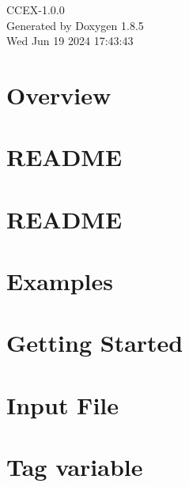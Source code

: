 \documentclass[twoside]{book}
\newcommand{\clearemptydoublepage}{%
  \newpage{\pagestyle{empty}\cleardoublepage}%
}
\begin{document}
\hypersetup{pageanchor=false}
\begin{titlepage}
\vspace*{7cm}
\begin{center}%
{\Large C\-C\-E\-X-\/1.0.0 }\\
\vspace*{1cm}
{\large Generated by Doxygen 1.8.5}\\
\vspace*{0.5cm}
{\small Wed Jun 19 2024 17:43:43}\\
\end{center}
\end{titlepage}
\clearemptydoublepage
\tableofcontents
\clearemptydoublepage
{}
\hypersetup{pageanchor=true}

\chapter{Overview}
\label{index}\hypertarget{index}{}
\chapter{R\-E\-A\-D\-M\-E}
\label{md__home_huijin_git_CCEX_README}
\hypertarget{md__home_huijin_git_CCEX_README}{}

\chapter{R\-E\-A\-D\-M\-E}
\label{README}
\hypertarget{README}{}

\chapter{Examples}
\label{Examples}
\hypertarget{Examples}{}

\chapter{Getting Started}
\label{GettingStarted}
\hypertarget{GettingStarted}{}

\chapter{Input File}
\label{InputFile}
\hypertarget{InputFile}{}

\chapter{Tag variable}
\label{TagVariable}
\hypertarget{TagVariable}{}

\end{document}
